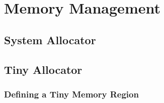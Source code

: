 \chapter{Memory Management}
\section{System Allocator}
\section{Tiny Allocator}

\subsection{Defining a Tiny Memory Region}

